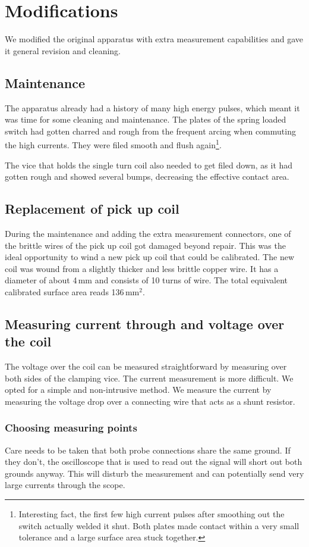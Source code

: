 \section{Modifications}
We modified the original apparatus with extra measurement capabilities and 
gave it general revision and cleaning.

\subsection{Maintenance}
The apparatus already had a history of many high energy pulses, which meant 
it was time for some cleaning and maintenance. The plates of the spring 
loaded switch had gotten charred and rough from the frequent arcing when 
commuting the high currents. They were filed smooth and flush 
again\footnote{Interesting fact, the first few high current pulses after 
smoothing out the switch actually welded it shut. Both plates made contact 
within a very small tolerance and a large surface area stuck together.}.

The vice that holds the single turn coil also needed to get filed down, as 
it had gotten rough and showed several bumps, decreasing the effective 
contact area.

\subsection{Replacement of pick up coil}
During the maintenance and adding the extra measurement connectors, one of 
the brittle wires of the pick up coil got damaged beyond repair. This was 
the ideal opportunity to wind a new pick up coil that could be calibrated. 
The new coil was wound from a slightly thicker and less brittle copper 
wire. It has a diameter of about 4\,mm and consists of 10 turns of wire. 
The total equivalent calibrated surface area reads 136\,mm$^2$.

\subsection{Measuring current through and voltage over the coil}
The voltage over the coil can be measured straightforward by measuring over 
both sides of the clamping vice. The current measurement is more difficult.  
We opted for a simple and non-intrusive method. We measure the current by 
measuring the voltage drop over a connecting wire that acts as a shunt 
resistor.

\subsubsection{Choosing measuring points}
Care needs to be taken that both probe connections share the same ground.  
If they don't, the oscilloscope that is used to read out the signal will 
short out both grounds anyway. This will disturb the measurement and can 
potentially send very large currents through the scope.

